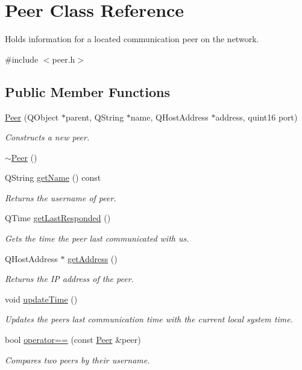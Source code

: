 \hypertarget{class_peer}{
\section{\-Peer \-Class \-Reference}
\label{class_peer}
}


\-Holds information for a located communication peer on the network.  




{\ttfamily \#include $<$peer.\-h$>$}

\subsection*{\-Public \-Member \-Functions}
\begin{DoxyCompactItemize}
\item 
\hyperlink{class_peer_a3360b580084c61a8bc31144ae2af912a}{\-Peer} (\-Q\-Object $\ast$parent, \-Q\-String $\ast$name, \-Q\-Host\-Address $\ast$address, quint16 port)
\begin{DoxyCompactList}\small\item\em \-Constructs a new peer. \end{DoxyCompactList}\item 
\hyperlink{class_peer_a6ba1719fdbd96ab8a3674e6a230856d1}{$\sim$\-Peer} ()
\item 
\-Q\-String \hyperlink{class_peer_ad66666aca923fe13b4cca3f836d12fa7}{get\-Name} () const 
\begin{DoxyCompactList}\small\item\em \-Returns the username of peer. \end{DoxyCompactList}\item 
\-Q\-Time \hyperlink{class_peer_a1c9797749ddfbb9261e93f51cc3ace9e}{get\-Last\-Responded} ()
\begin{DoxyCompactList}\small\item\em \-Gets the time the peer last communicated with us. \end{DoxyCompactList}\item 
\-Q\-Host\-Address $\ast$ \hyperlink{class_peer_ac1e626629eeaaeebff30f2eda36c3a5e}{get\-Address} ()
\begin{DoxyCompactList}\small\item\em \-Returns the \-I\-P address of the peer. \end{DoxyCompactList}\item 
void \hyperlink{class_peer_a49f70d43a1822edaeb8f3f7de66b12e3}{update\-Time} ()
\begin{DoxyCompactList}\small\item\em \-Updates the peers last communication time with the current local system time. \end{DoxyCompactList}\item 
bool \hyperlink{class_peer_afa304e14507579b7f3aaf8b2e7483f1a}{operator==} (const \hyperlink{class_peer}{\-Peer} \&peer)
\begin{DoxyCompactList}\small\item\em \-Compares two peers by their username. \end{DoxyCompactList}\end{DoxyCompactItemize}
